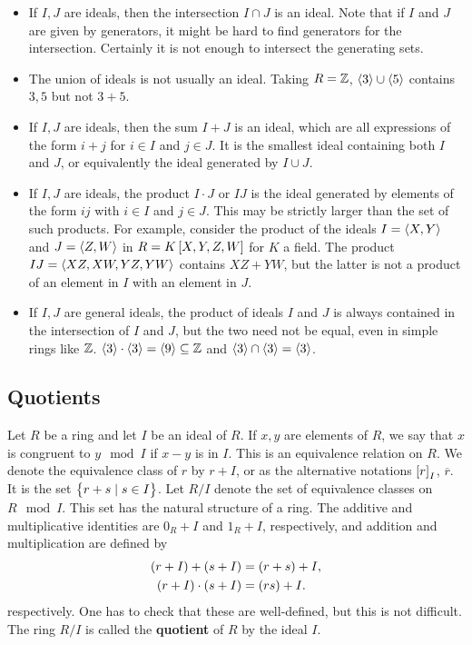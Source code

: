 \begin{example*}
\hfill
\begin{itemize}
\item If $ I, J $ are ideals, then the intersection $ I \cap J $ is an ideal. Note that if $ I $ and $ J $ are given by generators, it might be hard to find generators for the intersection. Certainly it is not enough to intersect the generating sets.
\item The union of ideals is not usually an ideal. Taking $ R = \mathbb{Z} $, $ \left\langle 3 \right\rangle \cup \left\langle 5 \right\rangle $ contains $ 3, 5 $ but not $ 3 + 5 $.
\item If $ I, J $ are ideals, then the sum $ I + J $ is an ideal, which are all expressions of the form $ i + j $ for $ i \in I $ and $ j \in J $. It is the smallest ideal containing both $ I $ and $ J $, or equivalently the ideal generated by $ I \cup J $.
\item If $ I, J $ are ideals, the product $ I \cdot J $ or $ IJ $ is the ideal generated by elements of the form $ ij $ with $ i \in I $ and $ j \in J $. This may be strictly larger than the set of such products. For example, consider the product of the ideals $ I = \left\langle X, Y \right\rangle $ and $ J = \left\langle Z, W \right\rangle $ in $ R = K\sbr{X, Y, Z, W} $ for $ K $ a field. The product $ IJ = \left\langle XZ, XW, YZ, YW \right\rangle $ contains $ XZ + YW $, but the latter is not a product of an element in $ I $ with an element in $ J $.
\item If $ I, J $ are general ideals, the product of ideals $ I $ and $ J $ is always contained in the intersection of $ I $ and $ J $, but the two need not be equal, even in simple rings like $ \mathbb{Z} $. $ \left\langle 3 \right\rangle \cdot \left\langle 3 \right\rangle = \left\langle 9 \right\rangle \subseteq \mathbb{Z} $ and $ \left\langle 3 \right\rangle \cap \left\langle 3 \right\rangle = \left\langle 3 \right\rangle $.
\end{itemize}
\end{example*}

\subsection{Quotients}

Let $ R $ be a ring and let $ I $ be an ideal of $ R $. If $ x, y $ are elements of $ R $, we say that $ x $ is congruent to $ y \mod I $ if $ x - y $ is in $ I $. This is an equivalence relation on $ R $. We denote the equivalence class of $ r $ by $ r + I $, or as the alternative notations $ \sbr{r}_I $, $ \overline{r} $. It is the set $ \cbr{r + s \mid s \in I} $. Let $ R / I $ denote the set of equivalence classes on $ R \mod I $. This set has the natural structure of a ring. The additive and multiplicative identities are $ 0_R + I $ and $ 1_R + I $, respectively, and addition and multiplication are defined by
\begin{align*}
\br{r + I} + \br{s + I} & = \br{r + s} + I, \\
\br{r + I} \cdot \br{s + I} & = \br{rs} + I.
\end{align*}
respectively. One has to check that these are well-defined, but this is not difficult. The ring $ R / I $ is called the \textbf{quotient} of $ R $ by the ideal $ I $.

